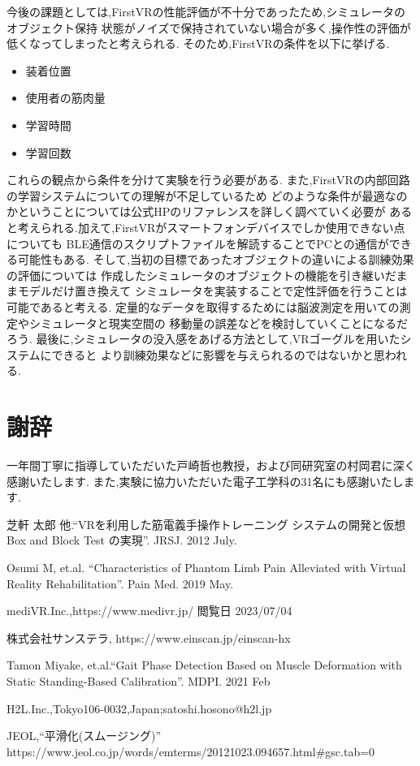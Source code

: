 \documentclass{ltjsreport}
\begin{document}
	今後の課題としては,FirstVRの性能評価が不十分であったため,シミュレータのオブジェクト保持
	状態がノイズで保持されていない場合が多く,操作性の評価が低くなってしまったと考えられる.
	そのため,FirstVRの条件を以下に挙げる.
	\begin{itemize}
		\item 装着位置
		\item 使用者の筋肉量
		\item 学習時間
		\item 学習回数
	\end{itemize}
	これらの観点から条件を分けて実験を行う必要がある.
	また,FirstVRの内部回路の学習システムについての理解が不足しているため
	どのような条件が最適なのかということについては公式HPのリファレンスを詳しく調べていく必要が
	あると考えられる.加えて,FirstVRがスマートフォンデバイスでしか使用できない点についても
	BLE通信のスクリプトファイルを解読することでPCとの通信ができる可能性もある.
	そして,当初の目標であったオブジェクトの違いによる訓練効果の評価については
	作成したシミュレータのオブジェクトの機能を引き継いだままモデルだけ置き換えて
	シミュレータを実装することで定性評価を行うことは可能であると考える.
	定量的なデータを取得するためには脳波測定を用いての測定やシミュレータと現実空間の
	移動量の誤差などを検討していくことになるだろう.
	最後に,シミュレータの没入感をあげる方法として,VRゴーグルを用いたシステムにできると
	より訓練効果などに影響を与えられるのではないかと思われる.
\clearpage

\chapter*{謝辞}
一年間丁寧に指導していただいた戸崎哲也教授，および同研究室の村岡君に深く感謝いたします.
また,実験に協力いただいた電子工学科の31名にも感謝いたします.

\begin{thebibliography}{99}

	芝軒 太郎 他.``VRを利用した筋電義手操作トレーニング
	システムの開発と仮想 Box and Block Test の実現''.
	JRSJ. 2012 July.

	Osumi M, et.al.
	``Characteristics of Phantom Limb Pain Alleviated
	with Virtual Reality Rehabilitation''.
	Pain Med. 2019 May.

	mediVR.Inc.,https://www.medivr.jp/
	閲覧日 2023/07/04
	

	株式会社サンステラ, https://www.einscan.jp/einscan-hx
	
	Tamon Miyake, et.al.``Gait Phase Detection Based on Muscle Deformation
	with Static Standing-Based Calibration''.
	MDPI. 2021 Feb


	H2L.Inc.,Tokyo106-0032,Japan;satoshi.hosono@h2l.jp

	JEOL,``平滑化(スムージング)''\\
	https://www.jeol.co.jp/words/emterms/20121023.094657.html\#gsc.tab=0

\end{thebibliography}
\end{document}

